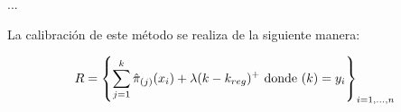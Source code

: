 ... 

La calibración de este método se realiza de la siguiente manera:

$$
R = \left\{ \sum_{j=1}^k \hat{\pi}_{(j)}(x_i) + \lambda (k-k_{reg})^+ \\
\textnormal{ donde } (k)=y_i \right\}_{i=1,...,n}
$$






